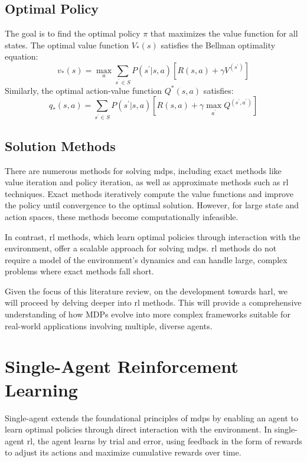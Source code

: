 \subsection*{Optimal Policy}
The goal is to find the optimal policy \(\pi\) that maximizes the value function for all states. 
The optimal value function \(V_*(s)\) satisfies the Bellman optimality equation:
\[
    v_*(s) = \max_a \sum_{s^\prime \in S} P(s^\prime|s, a) [R(s, a) + \gamma V^(s^\prime)] 
\]
Similarly, the optimal action-value function \(Q^*(s, a)\) satisfies:
\[
    q_*(s, a) = \sum_{s^\prime \in S} P(s^\prime|s, a) 
    [R(s, a) + \gamma \max_{a^\prime} Q^(s^\prime, a^\prime)] 
\]

\subsection*{Solution Methods}
There are numerous methods for solving \glspl{mdp}, including exact methods like 
value iteration and policy iteration, as well as approximate methods such as \gls{rl} techniques. 
Exact methods iteratively compute the value functions and improve 
the policy until convergence to the optimal solution. 
However, for large state and action spaces, these methods become computationally infeasible.

In contrast, \gls{rl} methods, which learn optimal policies through interaction with the 
environment, offer a scalable approach for solving \glspl{mdp}. 
\gls{rl} methods do not require a model of the environment's dynamics and can handle large, 
complex problems where exact methods fall short.

Given the focus of this literature review, on the development towards \gls{harl}, 
we will proceed by delving deeper into \gls{rl} methods. 
This will provide a comprehensive understanding of how MDPs evolve into more complex frameworks
suitable for real-world applications involving multiple, diverse agents.


\section*{Single-Agent Reinforcement Learning}

Single-agent  extends the foundational principles of \glspl{mdp} by enabling 
an agent to learn optimal policies through direct interaction with the environment. 
In single-agent \gls{rl}, the agent learns by trial and error, using feedback in the form of 
rewards to adjust its actions and maximize cumulative rewards over time.

